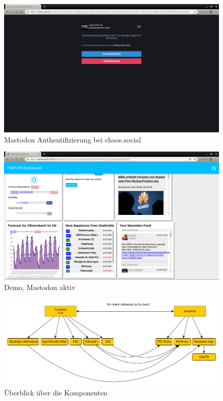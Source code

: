 \documentclass[fleqn,10pt]{SelfArx} %
\begin{document}
\begin{figure}
\includegraphics[width=\linewidth]{images/2.png}
\caption{Mastodon Authentifizierung bei chaos.social}\label{fig:demo2}
\end{figure}

\begin{figure}
    \includegraphics[width=\linewidth]{images/3.png}
    \caption{Demo, Mastodon aktiv}\label{fig:demo3}
\end{figure}
\begin{figure}
	\includegraphics[width=\linewidth]{systemcomponent.jpg}
	\caption{Überblick über die Komponenten}
	\label{fig:component}
\end{figure}
\end{document}
